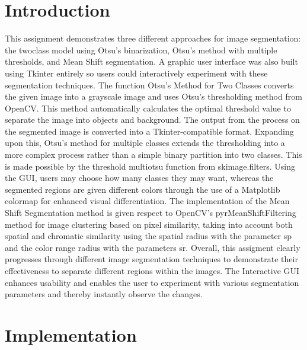\chapter{Introduction}

This assignment demonstrates three different approaches for image segmentation: the twoclass model using Otsu's binarization, Otsu's method with multiple thresholds, and Mean Shift segmentation. A graphic user interface was also built using Tkinter entirely so users could interactively experiment with these segmentation techniques. The function Otsu's Method for Two Classes converts the given image into a grayscale image and uses Otsu's thresholding method from OpenCV. This method automatically calculates the optimal threshold value to separate the image into objects and background. The output from the process on the segmented image is converted into a Tkinter-compatible format. Expanding upon this, Otsu's method for multiple classes extends the thresholding into a more complex process rather than a simple binary partition into two classes. This is made possible by the threshold multiotsu function from skimage.filters. Using the GUI, users may choose how many classes they may want, whereas the segmented regions are given different colors through the use of a Matplotlib colormap for enhanced visual differentiation. The implementation of the Mean Shift Segmentation method is given respect to OpenCV's pyrMeanShiftFiltering method for image clustering based on pixel similarity, taking into account both spatial and chromatic similarity using the spatial radius with the parameter sp and the color range radius with the parameters sr. Overall, this assigment clearly progresses through different image segmentation techniques to demonstrate their effectiveness to separate different regions within the images. The Interactive GUI enhances usability and  enables the user to experiment with various segmentation parameters and thereby instantly observe the changes. %

\chapter{Implementation}
